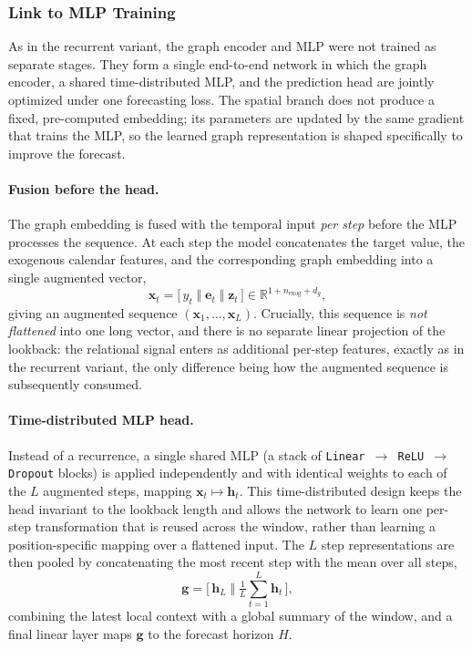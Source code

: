 \subsubsection{Link to MLP Training}
\label{sec:gcn_mlp_link}

As in the recurrent variant, the graph encoder and MLP were not trained as separate stages. They form a single end-to-end network in which the graph encoder, a shared time-distributed MLP, and the prediction head are jointly optimized under one forecasting loss. The spatial branch does not produce a fixed, pre-computed embedding; its parameters are updated by the same gradient that trains the MLP, so the learned graph representation is shaped specifically to improve the forecast.

\paragraph{Fusion before the head.}
The graph embedding is fused with the temporal input \emph{per step} before the MLP processes the sequence. At each step the model concatenates the target value, the exogenous calendar features, and the corresponding graph embedding into a single augmented vector,
\[
\mathbf{x}_t = \big[\, y_t \;\Vert\; \mathbf{e}_t \;\Vert\; \mathbf{z}_t \,\big]
\in \mathbb{R}^{1 + n_\text{exog} + d_g},
\]
giving an augmented sequence $(\mathbf{x}_1, \dots, \mathbf{x}_L)$. Crucially, this sequence is \emph{not flattened} into one long vector, and there is no separate linear projection of the lookback: the relational signal enters as additional per-step features, exactly as in the recurrent variant, the only difference being how the augmented sequence is subsequently consumed.

\paragraph{Time-distributed MLP head.}
Instead of a recurrence, a single shared MLP (a stack of \texttt{Linear $\to$ ReLU $\to$ Dropout} blocks) is applied independently and with identical weights to each of the $L$ augmented steps, mapping $\mathbf{x}_t \mapsto \mathbf{h}_t$. This time-distributed design keeps the head invariant to the lookback length and allows the network to learn one per-step transformation that is reused across the window, rather than learning a position-specific mapping over a flattened input. The $L$ step representations are then pooled by concatenating the most recent step with the mean over all steps,
\[
\mathbf{g} = \big[\, \mathbf{h}_L \;\Vert\; \tfrac{1}{L}\textstyle\sum_{t=1}^{L}\mathbf{h}_t \,\big],
\]
combining the latest local context with a global summary of the window, and a final linear layer maps $\mathbf{g}$ to the forecast horizon $H$.

